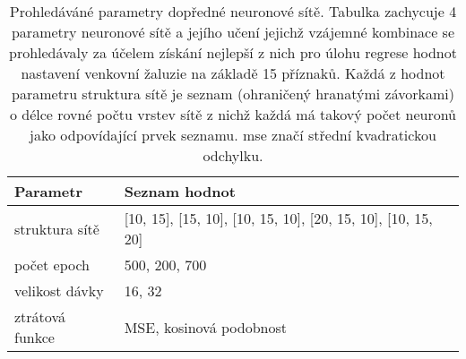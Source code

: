 \begin{table}[htbp]
  \centering
    \begin{tabular}{l|l}
    \toprule
    Parametr & Seznam hodnot \\
    \midrule
    \midrule
    struktura sítě & [10, 15], [15, 10], [10, 15, 10], [20, 15, 10], [10, 15, 20] \\
    \midrule
    počet epoch & 500, 200, 700 \\
    \midrule
    velikost dávky & 16, 32 \\
    \midrule
    ztrátová funkce & MSE, kosinová podobnost \\
    \bottomrule
    \bottomrule
    \end{tabular}%
    \caption[Prohledáváné parametry dopředné neuronové sítě]{Prohledáváné parametry dopředné neuronové sítě. Tabulka zachycuje 4 parametry neuronové sítě a jejího učení jejichž vzájemné kombinace se prohledávaly za účelem získání nejlepší z nich pro úlohu regrese hodnot nastavení venkovní žaluzie na základě 15 příznaků. Každá z hodnot parametru struktura sítě je seznam (ohraničený hranatými závorkami) o délce rovné počtu vrstev sítě z nichž každá má takový počet neuronů jako odpovídající prvek seznamu. \acrshort{mse} značí střední kvadratickou odchylku.}
  \label{tab:ffnnhyper}%
\end{table}%